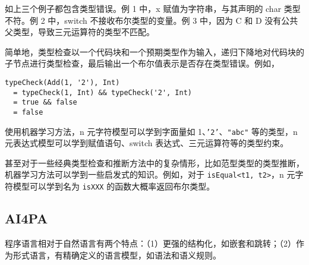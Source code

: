 如上三个例子都包含类型错误。例 1 中，x 赋值为字符串，与其声明的 char 类型不符。例 2 中，switch 不接收布尔类型的变量。例 3 中，因为 C 和 D 没有公共父类型，导致三元运算符的类型不匹配。

简单地，类型检查以一个代码块和一个预期类型作为输入，递归下降地对代码块的子节点进行类型检查，最后输出一个布尔值表示是否存在类型错误。例如，

\begin{lstlisting}[frame=none,numbers=none]
typeCheck(Add(1, '2'), Int)
  = typeCheck(1, Int) && typeCheck('2', Int)
  = true && false
  = false
\end{lstlisting}

使用机器学习方法，n 元字符模型可以学到字面量如 1、\texttt{'2'}、\texttt{"abc"} 等的类型，n 元表达式模型可以学到赋值语句、switch 表达式、三元运算符等的类型约束。

甚至对于一些经典类型检查和推断方法中的复杂情形，比如范型类型的类型推断，机器学习方法可以学到一些启发式的知识。例如，对于 \texttt{isEqual<t1, t2>}，n 元字符模型可以学到名为 \texttt{isXXX} 的函数大概率返回布尔类型。

\subsection{AI4PA}

程序语言相对于自然语言有两个特点：（1）更强的结构化，如嵌套和跳转；（2）作为形式语言，有精确定义的语言模型，如语法和语义规则。

